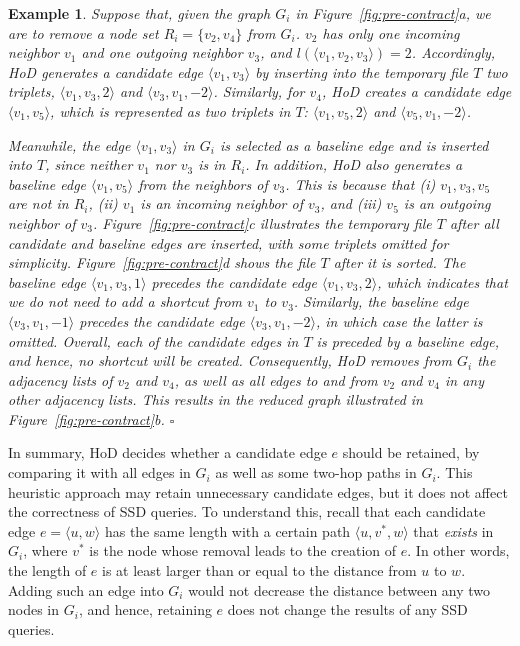 \documentclass{sig-alternate}
\newtheorem{example} {Example}
\def\done{\hspace*{\fill} {$\square$}}
\def\v{v^*}
\begin{document}
\begin{sloppy}
\begin{example} \label{example:pre-removal}
\em
Suppose that, given the graph $G_i$ in Figure~\ref{fig:pre-contract}a, we are to remove a node set $R_i = \{v_2, v_4\}$ from $G_i$. $v_2$ has only one incoming neighbor $v_1$ and one outgoing neighbor $v_3$, and $l(\langle v_1, v_2, v_3\rangle) = 2$. Accordingly, HoD generates a candidate edge $\langle v_1, v_3\rangle$ by inserting into the temporary file $T$ two triplets, $\langle v_1, v_3, 2\rangle$ and $\langle v_3, v_1, -2\rangle$. Similarly, for $v_4$, HoD creates a candidate edge $\langle v_1, v_5\rangle$, which is represented as two triplets in $T$: $\langle v_1, v_5, 2\rangle$ and $\langle v_5, v_1, -2\rangle$.

Meanwhile, the edge $\langle v_1, v_3\rangle$ in $G_i$ is selected as a baseline edge and is inserted into $T$, since neither $v_1$ nor $v_3$ is in $R_i$. In addition, HoD also generates a baseline edge $\langle v_1, v_5\rangle$ from the neighbors of $v_3$. This is because that (i) $v_1, v_3, v_5$ are not in $R_i$, (ii) $v_1$ is an incoming neighbor of $v_3$, and (iii) $v_5$ is an outgoing neighbor of $v_3$. Figure~\ref{fig:pre-contract}c illustrates the temporary file $T$ after all candidate and baseline edges are inserted, with some triplets omitted for simplicity. Figure~\ref{fig:pre-contract}d shows the file $T$ after it is sorted. The baseline edge $\langle v_1, v_3, 1\rangle$ precedes the candidate edge $\langle v_1, v_3, 2\rangle$, which indicates that we do not need to add a shortcut from $v_1$ to $v_3$. Similarly, the baseline edge $\langle v_3, v_1, -1\rangle$ precedes the candidate edge $\langle v_3, v_1, -2\rangle$, in which case the latter is omitted. Overall, each of the candidate edges in $T$ is preceded by a baseline edge, and hence, no shortcut will be created. Consequently, HoD removes from $G_i$ the adjacency lists of $v_2$ and $v_4$, as well as all edges to and from $v_2$ and $v_4$ in any other adjacency lists. This results in the reduced graph illustrated in Figure~\ref{fig:pre-contract}b. \done
\end{example}

In summary, HoD decides whether a candidate edge $e$ should be retained, by comparing it with all edges in $G_i$ as well as some two-hop paths in $G_i$. This heuristic approach may retain unnecessary candidate edges, but it does not affect the correctness of SSD queries. To understand this, recall that each candidate edge $e = \langle u, w\rangle$ has the same length with a certain path $\langle u, \v, w\rangle$ that {\em exists} in $G_i$, where $\v$ is the node whose removal leads to the creation of $e$. In other words, the length of $e$ is at least larger than or equal to the distance from $u$ to $w$. Adding such an edge into $G_i$ would not decrease the distance between any two nodes in $G_i$, and hence, retaining $e$ does not change the results of any SSD queries.


\end{sloppy}
\end{document}
